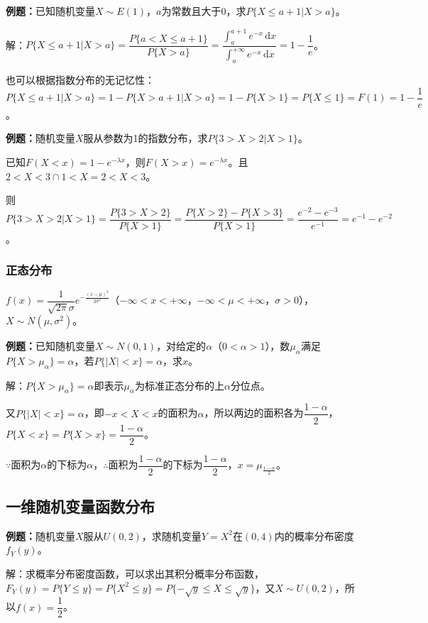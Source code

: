\textbf{例题：}已知随机变量$X\sim E(1)$，$a$为常数且大于0，求$P\{X\leqslant a+1|X>a\}$。

解：$P\{X\leqslant a+1|X>a\}=\dfrac{P\{a<X\leqslant a+1\}}{P\{X>a\}}=\dfrac{\int_a^{a+1}e^{-x}\,\textrm{d}x}{\int_a^{+\infty}e^{-x}\,\textrm{d}x}=1-\dfrac{1}{e}$。

也可以根据指数分布的无记忆性：$P\{X\leqslant a+1|X>a\}=1-P\{X>a+1|X>a\}=1-P\{X>1\}=P\{X\leqslant1\}=F(1)=1-\dfrac{1}{e}$。

\textbf{例题：}随机变量$X$服从参数为1的指数分布，求$P\{3>X>2|X>1\}$。

已知$F(X<x)=1-e^{-\lambda x}$，则$F(X>x)=e^{-\lambda x}$。且$2<X<3\cap 1<X=2<X<3$。

则$P\{3>X>2|X>1\}=\dfrac{P\{3>X>2\}}{P\{X>1\}}=\dfrac{P\{X>2\}-P\{X>3\}}{P\{X>1\}}=\dfrac{e^{-2}-e^{-3}}{e^{-1}}=e^{-1}-e^{-2}$。

\subsubsection{正态分布}

$f(x)=\dfrac{1}{\sqrt{2\pi}\sigma}e^{-\frac{(x-\mu)^2}{2\sigma^2}}$（$-\infty<x<+\infty$，$-\infty<\mu<+\infty$，$\sigma>0$），$X\sim N(\mu,\sigma^2)$。

\textbf{例题：}已知随机变量$X\sim N(0,1)$，对给定的$\alpha$（$0<\alpha>1$），数$\mu_\alpha$满足$P\{X>\mu_\alpha\}=\alpha$，若$P\{\vert X\vert<x\}=\alpha$，求$x$。

解：$P\{X>\mu_\alpha\}=\alpha$即表示$\mu_\alpha$为标准正态分布的上$\alpha$分位点。

又$P\{\vert X\vert<x\}=\alpha$，即$-x<X<x$的面积为$\alpha$，所以两边的面积各为$\dfrac{1-\alpha}{2}$，$P\{X<x\}=P\{X>x\}=\dfrac{1-\alpha}{2}$。

$\because$面积为$\alpha$的下标为$\alpha$，$\therefore$面积为$\dfrac{1-\alpha}{2}$的下标为$\dfrac{1-\alpha}{2}$，$x=\mu_\frac{1-\alpha}{2}$。

\subsection{一维随机变量函数分布}

\textbf{例题：}随机变量$X$服从$U(0,2)$，求随机变量$Y=X^2$在$(0,4)$内的概率分布密度$f_Y(y)$。

解：求概率分布密度函数，可以求出其积分概率分布函数，$F_Y(y)=P\{Y\leqslant y\}=P\{X^2\leqslant y\}=P\{-\sqrt{y}\leqslant X\leqslant\sqrt{y}\}$，又$X\sim U(0,2)$，所以$f(x)=\dfrac{1}{2}$。

